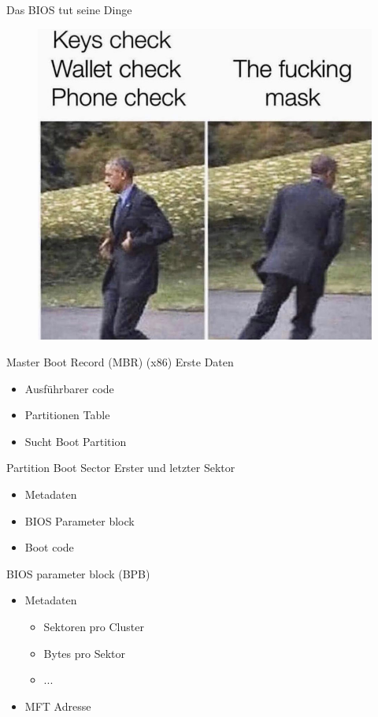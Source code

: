 \documentclass[12pt]{beamer}
\begin{document}
\begin{frame}{Das BIOS tut seine Dinge}
\begin{figure}
\includegraphics[scale=0.25]{checking.jpg}
\end{figure}
\end{frame}

\begin{frame}{Master Boot Record (MBR) (x86)}
\Large
Erste Daten
\begin{itemize}
\item Ausführbarer code
\item Partitionen Table
\item Sucht Boot Partition
\end{itemize}
\end{frame}

\begin{frame}{Partition Boot Sector}
\Large
Erster und letzter Sektor
\begin{itemize}
\item Metadaten
\item BIOS Parameter block
\item Boot code
\end{itemize}
\end{frame}

\begin{frame}{BIOS parameter block (BPB)}
\begin{itemize}
\item Metadaten
\begin{itemize}
\item Sektoren pro Cluster
\item Bytes pro Sektor
\item ...
\end{itemize}
\item MFT Adresse
\end{itemize}
\end{frame}
\end{document}
